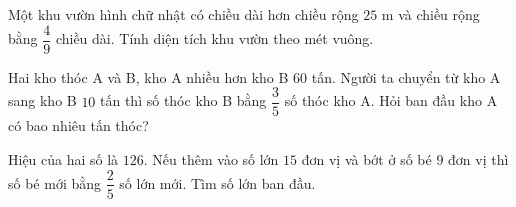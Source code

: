 \begin{ex} %
Một khu vườn hình chữ nhật có chiều dài hơn chiều rộng $25\text{ m}$ và chiều rộng bằng $\dfrac{4}{9}$ chiều dài. Tính diện tích khu vườn theo mét vuông.
\end{ex}

\begin{ex} %
Hai kho thóc A và B, kho A nhiều hơn kho B $60$ tấn. Người ta chuyển từ kho A sang kho B $10$ tấn thì số thóc kho B bằng $\dfrac{3}{5}$ số thóc kho A. Hỏi ban đầu kho A có bao nhiêu tấn thóc?
\end{ex}

\begin{ex} %
Hiệu của hai số là $126$. Nếu thêm vào số lớn $15$ đơn vị và bớt ở số bé $9$ đơn vị thì số bé mới bằng $\dfrac{2}{5}$ số lớn mới. Tìm số lớn ban đầu.
\end{ex}
